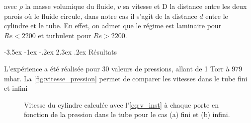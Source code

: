 \documentclass[a4paper, 12pt,oneside]{article}
\makeatletter
\renewcommand{\section}{\@startsection {section}{1}{\z@}%
             {-3.5ex \@plus -1ex \@minus -.2ex}%
             {2.3ex \@plus.2ex}%
             {\normalfont\normalsize\bfseries}}
\makeatother
\begin{document}
avec $\rho$ la masse volumique du fluide, $v$ sa vitesse et D la distance entre les deux parois où le fluide circule, dans notre cas il s'agit de la distance $d$ entre le cylindre et le tube.
En effet, on admet que le régime est laminaire pour $Re < 2200$ et turbulent pour $Re>2200$. 
%



 
%
\newpage
\section{Résultats}

L'expérience a été réalisée pour 30 valeurs de pressions, allant de 1 Torr à 979 mbar. La \autoref{fig:vitesse_pression} permet de comparer les vitesses dans le tube fini et infini

\begin{figure}[h!]
    \centering
    \begin{subfigure}[b]{0.48\textwidth}
        \centering
        \caption{}
        \label{fig:v_vs_p_fini}
    \end{subfigure}
    \hfill 
    \begin{subfigure}[b]{0.48\textwidth}
        \centering
        \caption{}
        \label{fig:v_vs_p_inf}
    \end{subfigure}
    
    \caption{Vitesse du cylindre calculée avec l'\autoref{eq:v_inst} à chaque porte en fonction de la pression dans le tube pour le cas (a) fini et (b) infini. }
    \label{fig:vitesse_pression}
\end{figure}
\end{document}

